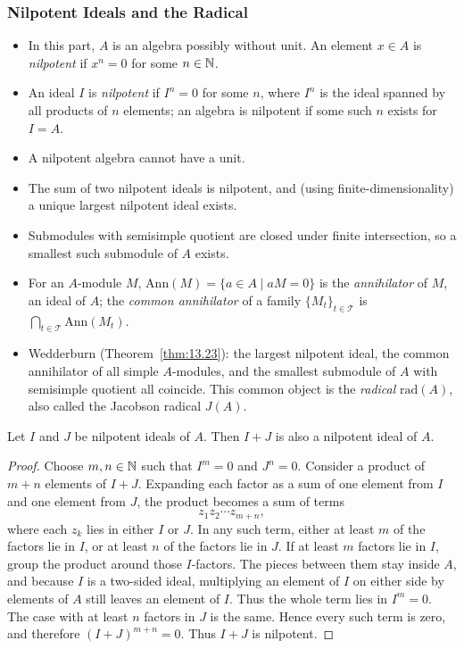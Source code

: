 \documentclass[../Odyssey_Project.tex]{subfiles}
\begin{document}
\subsubsection*{Nilpotent Ideals and the Radical}
\begin{itemize}
    \item In this part, $A$ is an algebra possibly without unit. An element $x \in A$ is \emph{nilpotent} if $x^n = 0$ for some $n \in \mathbb{N}$.
    \item An ideal $I$ is \emph{nilpotent} if $I^n = 0$ for some $n$, where $I^n$ is the ideal spanned by all products of $n$ elements; an algebra is nilpotent if some such $n$ exists for $I = A$.
    \item A nilpotent algebra cannot have a unit.
    \item The sum of two nilpotent ideals is nilpotent, and (using finite-dimensionality) a unique largest nilpotent ideal exists.
    \item Submodules with semisimple quotient are closed under finite intersection, so a smallest such submodule of $A$ exists.
    \item For an $A$-module $M$, $\mathrm{Ann}(M) = \{a \in A \mid aM = 0\}$ is the \emph{annihilator} of $M$, an ideal of $A$; the \emph{common annihilator} of a family $\{M_t\}_{t \in \mathcal{T}}$ is $\bigcap_{t \in \mathcal{T}} \mathrm{Ann}(M_t)$.
    \item Wedderburn (Theorem~\ref{thm:13.23}): the largest nilpotent ideal, the common annihilator of all simple $A$-modules, and the smallest submodule of $A$ with semisimple quotient all coincide. This common object is the \emph{radical} $\mathrm{rad}(A)$, also called the Jacobson radical $J(A)$.
\end{itemize}

\begin{lemma}
\label{lem:13.19}
Let $I$ and $J$ be nilpotent ideals of $A$. Then $I + J$ is also a nilpotent ideal of $A$.
\end{lemma}
\begin{proof}
    Choose $m,n \in \mathbb{N}$ such that $I^m=0$ and $J^n=0$. Consider a product of $m+n$ elements of $I+J$. Expanding each factor as a sum of one element from $I$ and one element from $J$, the product becomes a sum of terms
    \[
        z_1z_2\cdots z_{m+n},
    \]
    where each $z_k$ lies in either $I$ or $J$. In any such term, either at least $m$ of the factors lie in $I$, or at least $n$ of the factors lie in $J$. If at least $m$ factors lie in $I$, group the product around those $I$-factors. The pieces between them stay inside $A$, and because $I$ is a two-sided ideal, multiplying an element of $I$ on either side by elements of $A$ still leaves an element of $I$. Thus the whole term lies in $I^m=0$. The case with at least $n$ factors in $J$ is the same. Hence every such term is zero, and therefore $(I+J)^{m+n}=0$. Thus $I+J$ is nilpotent.
\end{proof}
\end{document}
